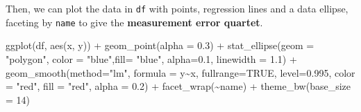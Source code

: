\documentclass[
  letterpaper,
  10pt,
  krantz2]{krantz}
\makeatletter
\newenvironment{Shaded}{\begin{snugshade}}{\end{snugshade}}
\newcommand{\AttributeTok}[1]{\textcolor[rgb]{0.40,0.45,0.13}{#1}}
\newcommand{\CommentTok}[1]{\textcolor[rgb]{0.37,0.37,0.37}{#1}}
\newcommand{\ConstantTok}[1]{\textcolor[rgb]{0.56,0.35,0.01}{#1}}
\newcommand{\DecValTok}[1]{\textcolor[rgb]{0.68,0.00,0.00}{#1}}
\newcommand{\FloatTok}[1]{\textcolor[rgb]{0.68,0.00,0.00}{#1}}
\newcommand{\FunctionTok}[1]{\textcolor[rgb]{0.28,0.35,0.67}{#1}}
\newcommand{\NormalTok}[1]{\textcolor[rgb]{0.00,0.23,0.31}{#1}}
\newcommand{\OtherTok}[1]{\textcolor[rgb]{0.00,0.23,0.31}{#1}}
\newcommand{\SpecialCharTok}[1]{\textcolor[rgb]{0.37,0.37,0.37}{#1}}
\newcommand{\StringTok}[1]{\textcolor[rgb]{0.13,0.47,0.30}{#1}}
\newenvironment{kframe}{%
  \medskip{}
  \setlength{\fboxsep}{.8em}
  \def\at@end@of@kframe{}%
  \ifinner\ifhmode%
  \def\at@end@of@kframe{\end{minipage}}%
  \begin{minipage}{\columnwidth}%
  \fi\fi%
  \def\FrameCommand##1{\hskip\@totalleftmargin \hskip-\fboxsep
  \colorbox{shadecolor}{##1}\hskip-\fboxsep
      \hskip-\linewidth \hskip-\@totalleftmargin \hskip\columnwidth}%
  \MakeFramed {\advance\hsize-\width
    \@totalleftmargin\z@ \linewidth\hsize
    \@setminipage}}%
{\par\unskip\endMakeFramed%
  \at@end@of@kframe}
\renewenvironment{Shaded}{\begin{kframe}}{\end{kframe}}
\makeatother
\begin{document}
\begin{Shaded}
\end{Shaded}

Then, we can plot the data in \texttt{df} with points, regression lines
and a data ellipse, faceting by \texttt{name} to give the
\textbf{measurement error quartet}.

\begin{Shaded}
\begin{Highlighting}[]
\FunctionTok{ggplot}\NormalTok{(df, }\FunctionTok{aes}\NormalTok{(x, y)) }\SpecialCharTok{+}
  \FunctionTok{geom\_point}\NormalTok{(}\AttributeTok{alpha =} \FloatTok{0.3}\NormalTok{) }\SpecialCharTok{+}
  \FunctionTok{stat\_ellipse}\NormalTok{(}\AttributeTok{geom =} \StringTok{"polygon"}\NormalTok{, }
               \AttributeTok{color =} \StringTok{"blue"}\NormalTok{,}\AttributeTok{fill=} \StringTok{"blue"}\NormalTok{, }
               \AttributeTok{alpha=}\FloatTok{0.1}\NormalTok{, }\AttributeTok{linewidth =} \FloatTok{1.1}\NormalTok{) }\SpecialCharTok{+}
  \FunctionTok{geom\_smooth}\NormalTok{(}\AttributeTok{method=}\StringTok{"lm"}\NormalTok{, }\AttributeTok{formula =}\NormalTok{ y}\SpecialCharTok{\textasciitilde{}}\NormalTok{x, }\AttributeTok{fullrange=}\ConstantTok{TRUE}\NormalTok{, }\AttributeTok{level=}\FloatTok{0.995}\NormalTok{,}
              \AttributeTok{color =} \StringTok{"red"}\NormalTok{, }\AttributeTok{fill =} \StringTok{"red"}\NormalTok{, }\AttributeTok{alpha =} \FloatTok{0.2}\NormalTok{) }\SpecialCharTok{+}
  \FunctionTok{facet\_wrap}\NormalTok{(}\SpecialCharTok{\textasciitilde{}}\NormalTok{name) }\SpecialCharTok{+}
  \FunctionTok{theme\_bw}\NormalTok{(}\AttributeTok{base\_size =} \DecValTok{14}\NormalTok{)}
\end{Highlighting}
\end{Shaded}
\end{document}
